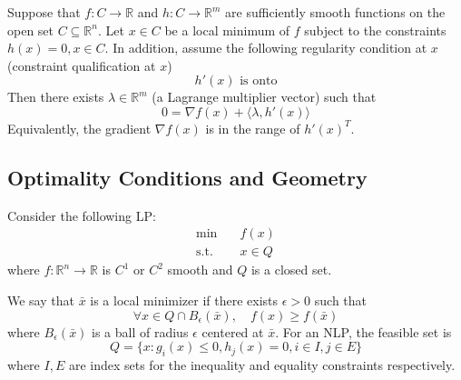 \begin{theorem}
    Suppose that $f: C \to \mathbb R$ and $h: C \to \mathbb R^m$ are sufficiently smooth functions on the open set $C \subseteq \mathbb R^n$. Let $x \in C$ be a local minimum of $f$ subject to the constraints $h(x) = 0, x \in C$. In addition, assume the following regularity condition at $x$ (constraint qualification at $x$) $$h'(x) \text{ is onto}$$
    Then there exists $\lambda \in \mathbb R^m$ (a Lagrange multiplier vector) such that $$0 = \nabla f(x) + \langle \lambda, h'(x) \rangle$$ Equivalently, the gradient $\nabla f(x)$ is in the range of $h'(x)^T$.
\end{theorem}
\subsection{Optimality Conditions and Geometry}
Consider the following LP:
\begin{align*}
    \min \quad & f(x) \\
    \text{s.t.} \quad & x \in Q
\end{align*}
where $f: \mathbb R^n \to \mathbb R$ is $C^1$ or $C^2$ smooth and $Q$ is a closed set.

We say that $\bar x$ is a local minimizer if there exists $\epsilon > 0$ such that $$\forall x \in Q \cap B_\epsilon(\bar x), \quad f(x) \geq f(\bar x)$$ where $B_\epsilon(\bar x)$ is a ball of radius $\epsilon$ centered at $\bar x$. For an NLP, the feasible set is 
$$Q = \{x: g_i(x) \leq 0, h_j(x) = 0, i \in I, j \in E\}$$
where $I,E$ are index sets for the inequality and equality constraints respectively.

